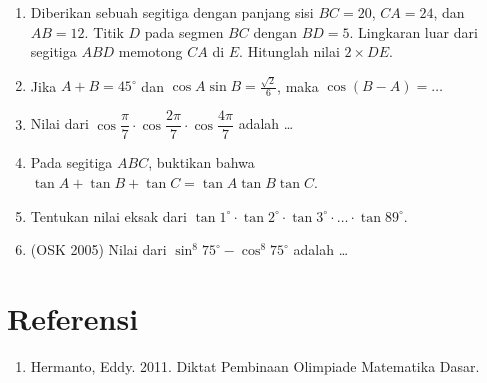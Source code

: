 \documentclass[11pt]{scrartcl}
\begin{document}
\begin{enumerate}
	\item
		Diberikan sebuah segitiga dengan panjang sisi $BC = 20$, $CA = 24$, dan $AB=12$. Titik $D$ pada segmen $BC$ dengan $BD = 5$. Lingkaran luar dari segitiga $ABD$ memotong $CA$ di $E$. Hitunglah nilai $2 \times DE$.
		
	\item Jika $A+B=45^\circ$ dan $\cos A\sin B=\frac{\sqrt{2}}{6}$, maka $\cos(B-A)=\dots$
	
	\item Nilai dari $\cos \dfrac{\pi}{7}\cdot \cos \dfrac{2\pi}{7} \cdot \cos \dfrac{4\pi}{7}$ adalah \dots
	
	\item Pada segitiga $ABC$, buktikan bahwa $\tan A + \tan B + \tan C = \tan A \tan B \tan C$.
	
	\item Tentukan nilai eksak dari $\tan 1^\circ \cdot \tan 2^\circ \cdot \tan 3^\circ \cdot \ldots \cdot \tan 89^\circ$.
	
	\item (OSK 2005) Nilai dari $\sin^8 75^\circ - \cos^8 75^\circ$ adalah \dots
\end{enumerate}
\section{Referensi}
\begin{enumerate}
    \item Hermanto, Eddy. 2011. Diktat Pembinaan Olimpiade Matematika Dasar.
\end{enumerate}
\end{document}
